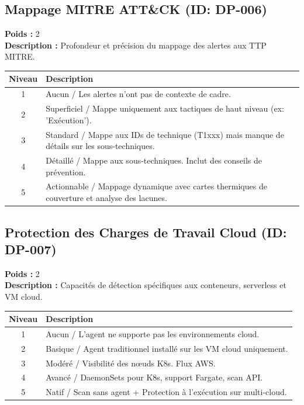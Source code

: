 \documentclass{article}
\begin{document}
\subsection{Mappage MITRE ATT\&CK (ID: DP-006)}
\textbf{Poids :} 2 \\
\textbf{Description :} Profondeur et précision du mappage des alertes aux TTP MITRE.
\vspace{0.3cm}
\begin{longtable}{|c|p{12cm}|}
\hline
\rowcolor{lightgray} \textbf{Niveau} & \textbf{Description} \\ \hline
1 & Aucun / Les alertes n'ont pas de contexte de cadre. \\ \hline
2 & Superficiel / Mappe uniquement aux tactiques de haut niveau (ex: 'Exécution'). \\ \hline
3 & Standard / Mappe aux IDs de technique (T1xxx) mais manque de détails sur les sous-techniques. \\ \hline
4 & Détaillé / Mappe aux sous-techniques. Inclut des conseils de prévention. \\ \hline
5 & Actionnable / Mappage dynamique avec cartes thermiques de couverture et analyse des lacunes. \\ \hline
\end{longtable}
\vspace{0.5cm}
\subsection{Protection des Charges de Travail Cloud (ID: DP-007)}
\textbf{Poids :} 2 \\
\textbf{Description :} Capacités de détection spécifiques aux conteneurs, serverless et VM cloud.
\vspace{0.3cm}
\begin{longtable}{|c|p{12cm}|}
\hline
\rowcolor{lightgray} \textbf{Niveau} & \textbf{Description} \\ \hline
1 & Aucun / L'agent ne supporte pas les environnements cloud. \\ \hline
2 & Basique / Agent traditionnel installé sur les VM cloud uniquement. \\ \hline
3 & Modéré / Visibilité des nœuds K8s. Flux AWS. \\ \hline
4 & Avancé / DaemonSets pour K8s, support Fargate, scan API. \\ \hline
5 & Natif / Scan sans agent + Protection à l'exécution sur multi-cloud. \\ \hline
\end{longtable}
\vspace{0.5cm}
\end{document}
